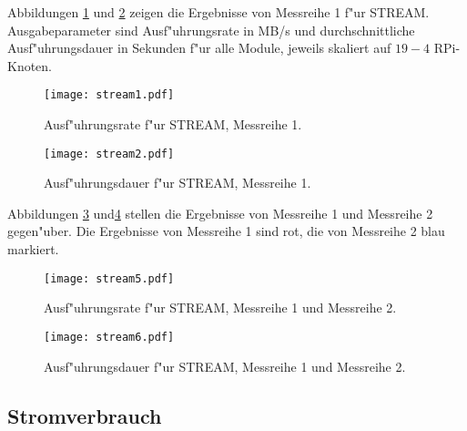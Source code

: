 Abbildungen \ref{fig:stream1} und \ref{fig:stream2} zeigen die Ergebnisse von Messreihe 1 f"ur STREAM. Ausgabeparameter sind Ausf"uhrungsrate in MB/s und durchschnittliche Ausf"uhrungsdauer in Sekunden f"ur alle Module, jeweils skaliert auf $19-4$ RPi-Knoten. 
\begin{figure}[htb]
  \centering
  \texttt{[image: stream1.pdf]}\\ 
  \caption{Ausf"uhrungsrate f"ur STREAM, Messreihe 1.}
  \label{fig:stream1}		
\end{figure}
\begin{figure}[H]
  \centering
  \texttt{[image: stream2.pdf]}\\ 
  \caption{Ausf"uhrungsdauer f"ur STREAM, Messreihe 1.}
  \label{fig:stream2}		
\end{figure}
\newpage
\noindent
Abbildungen \ref{fig:stream5} und\ref{fig:stream6} stellen die Ergebnisse von Messreihe 1 und Messreihe 2 gegen"uber. Die Ergebnisse von Messreihe 1 sind rot, die von Messreihe 2 blau markiert. 
\begin{figure}[htb]
  \centering
  \texttt{[image: stream5.pdf]}\\ 
  \caption{Ausf"uhrungsrate f"ur STREAM, Messreihe 1 und Messreihe 2.}\label{fig:stream5}
\end{figure}
\begin{figure}[H]
  \centering
  \texttt{[image: stream6.pdf]}\\ 
  \caption{Ausf"uhrungsdauer f"ur STREAM, Messreihe 1 und Messreihe 2.}\label{fig:stream6}
\end{figure}
\newpage
\subsection{Stromverbrauch}\label{Ergebnisse-Energenie}

